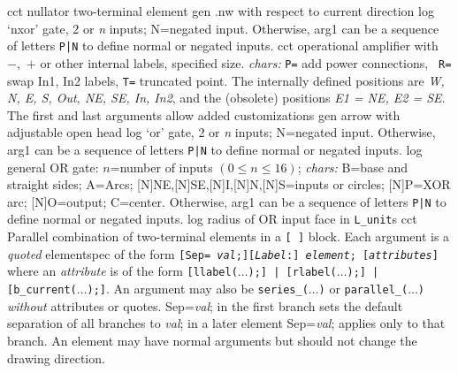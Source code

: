   {cct}
  { nullator two-terminal element }
  {gen}
  {.nw with respect to current direction}
  {log}
  {`nxor' gate, 2 or {\sl n\/} inputs; N=negated input.
   Otherwise, arg1 can be a sequence of letters {\tt P|N} to define
   normal or negated inputs.
    }
%
  {cct}
  {operational amplifier with $-,$ $+$ or other internal labels,
    specified size. {\sl chars:} {\tt P=} add power connections, {\tt
    R=} swap In1, In2 labels, {\tt T=} truncated point.  The internally
    defined positions are {\sl W, N, E, S, Out, NE, SE, In, In2}, and
    the (obsolete) positions {\sl E1 = NE, E2 = SE}.  The first and last
    arguments allow added customizations
   }
  {gen}
  {arrow with adjustable open head}
  {log}
  {`or' gate, 2 or {\sl n\/} inputs; N=negated input.
   Otherwise, arg1 can be a sequence of letters {\tt P|N} to define
   normal or negated inputs.
    }
  {log}
  {general OR gate: $n$=number of inputs $(0\leq n\leq 16)$;
    {\sl chars:} B=base and straight sides; A=Arcs;
           [N]NE,[N]SE,[N]I,[N]N,[N]S=inputs or circles; [N]P=XOR arc;
           [N]O=output; C=center.
   Otherwise, arg1 can be a sequence of letters {\tt P|N} to define
   normal or negated inputs.}
  {log}
  {radius of OR input face in {\tt L\_unit}s}
%
  {cct}
  { Parallel combination of two-terminal elements in a {\tt [
  ]} block.
    Each argument is a {\em quoted} elementspec of the form {\tt[Sep={\sl
    val};][{\sl Label}:] {\sl element}; [{\sl attributes}]} where
    an {\sl attribute} is of the form {\tt[llabel($\ldots$);] |
    [rlabel($\ldots$);] | [b\_current($\ldots$);]}.  An argument may
    also be {\tt series\_($\ldots$)} or {\tt parallel\_($\ldots$)} {\em
    without} attributes or quotes.  Sep={\sl val}; in the first branch
    sets the default separation of all branches to {\sl val}; in a later
    element Sep={\sl val}; applies only to that branch.  An element may
    have normal arguments but should not change the drawing direction.
   }
